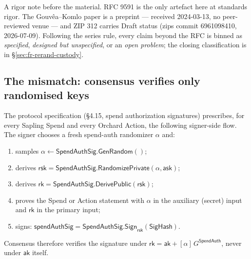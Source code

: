 \documentclass[11pt,a4paper]{article}
\theoremstyle{definition}
\newcommand{\rk}{\mathsf{rk}}
\newcommand{\ask}{\ensuremath{\mathsf{ask}}}
\newcommand{\aksym}{\ensuremath{\mathsf{ak}}}
\newcommand{\rsk}{\ensuremath{\mathsf{rsk}}}
\begin{document}
A rigor note before the material. RFC 9591 is the only artefact here at
standards rigor. The Gouv\^ea--Komlo paper is a preprint --- received
2024-03-13, no peer-reviewed venue --- and ZIP 312 carries Draft status
(zips commit 6961098410, 2026-07-09). Following the series rule, every
claim beyond the RFC is binned as \emph{specified}, \emph{designed but
unspecified}, or an \emph{open problem}; the closing classification is in
\S\ref{sec:fr-rerand-custody}.

\subsection{The mismatch: consensus verifies only randomised keys}
\label{sec:fr-rerand-gap}

The protocol specification (\S4.15, spend authorization signatures)
prescribes, for every Sapling Spend and every Orchard Action, the
following signer-side flow. The signer chooses a fresh spend-auth
randomizer $\alpha$ and:
\begin{enumerate}
\item samples $\alpha \gets \mathsf{SpendAuthSig.GenRandom}()$;
\item derives $\rsk =
  \mathsf{SpendAuthSig.RandomizePrivate}(\alpha, \ask)$;
\item derives $\rk =
  \mathsf{SpendAuthSig.DerivePublic}(\rsk)$;
\item proves the Spend or Action statement with $\alpha$ in the auxiliary
  (secret) input and $\rk$ in the primary input;
\item signs: $\mathsf{spendAuthSig} =
  \mathsf{SpendAuthSig.Sign}_{\rsk}(\mathsf{SigHash})$.
\end{enumerate}
Consensus therefore verifies the signature under
$\rk = \aksym + [\alpha]\,G^{\mathsf{SpendAuth}}$, never
under $\aksym$ itself.
\end{document}
